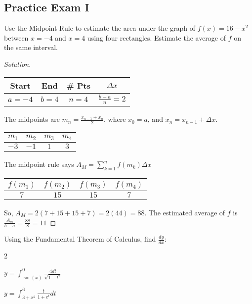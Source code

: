 \documentclass[crop=false,class=book,oneside]{standalone}
\begin{document}
\subsection{Practice Exam I}
\begin{problem}
Use the Midpoint Rule to estimate the area under the graph of $f(x)=16-x^{2}$ between $x=-4$ and $x=4$ using four rectangles. Estimate the average of $f$ on the same interval.
\end{problem}
\begin{proof}[Solution]
\
\begin{table}[H]
    \centering
    \begin{tabular}{|c|c|c|c|}
        \hline
        Start&End&\# Pts&$\Delta x$\\
        \hline
        $a=-4$&$b=4$&$n=4$&$\frac{b-a}{n}=2$\\
        \hline
    \end{tabular}
\end{table}
The midpoints are $m_{n}=\frac{x_{n-1}+x_{n}}{2}$, where $x_{0}=a$, and $x_{n}=x_{n-1}+\Delta x$.
\begin{table}[H]
    \centering
    \begin{tabular}{|c|c|c|c|}
        \hline
        $m_{1}$&$m_{2}$&$m_{3}$&$m_{4}$\\
        \hline
        $-3$&$-1$&$1$&$3$\\
        \hline
    \end{tabular}
\end{table}
The midpoint rule says $A_{M}=\sum_{k=1}^{n}f(m_{k})\Delta x$
\begin{table}[H]
    \centering
    \begin{tabular}{|c|c|c|c|}
        \hline
        $f(m_{1})$&$f(m_{2})$&$f(m_{3})$&$f(m_{4})$\\
        \hline
        $7$&$15$&$15$&$7$\\
        \hline
    \end{tabular}
\end{table}
So, $A_{M}=2(7+15+15+7)=2(44)=88$. The estimated average of $f$ is $\frac{A_{m}}{b-a}=\frac{88}{8}=11$
\end{proof}
\begin{problem}
Using the Fundamental Theorem of Calculus, find $\frac{dy}{dx}$:
\begin{enumerate}
\end{enumerate}
\end{problem}
\end{document}
